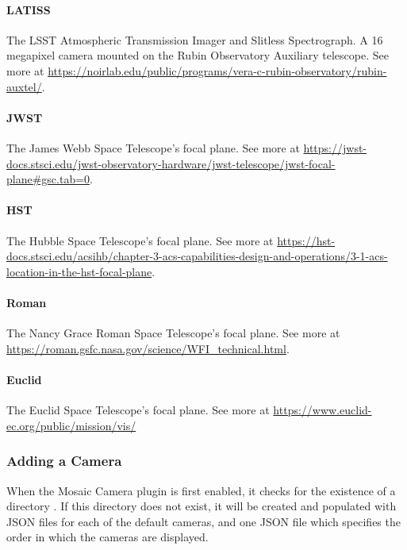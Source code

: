 \paragraph{LATISS}

The LSST Atmospheric Transmission Imager and Slitless Spectrograph. A 16 megapixel camera mounted on the Rubin Observatory Auxiliary telescope.
See more at \url{https://noirlab.edu/public/programs/vera-c-rubin-observatory/rubin-auxtel/}.

\paragraph{JWST}

The James Webb Space Telescope's focal plane. See more at \url{https://jwst-docs.stsci.edu/jwst-observatory-hardware/jwst-telescope/jwst-focal-plane#gsc.tab=0}.

\paragraph{HST}

The Hubble Space Telescope's focal plane. See more at \url{https://hst-docs.stsci.edu/acsihb/chapter-3-acs-capabilities-design-and-operations/3-1-acs-location-in-the-hst-focal-plane}.

\paragraph{Roman}

The Nancy Grace Roman Space Telescope's focal plane. See more at \url{https://roman.gsfc.nasa.gov/science/WFI_technical.html}.

\paragraph{Euclid}

The Euclid Space Telescope's focal plane. See more at \url{https://www.euclid-ec.org/public/mission/vis/}

\subsubsection{Adding a Camera}
\label{sec:plugins:MosaicCamera:cameras:add}
When the Mosaic Camera plugin is first enabled, it checks for the existence of a directory .
If this directory does not exist, it will be created and populated with JSON files for each of the default cameras, and one JSON file  which specifies the order in which the cameras are displayed.

